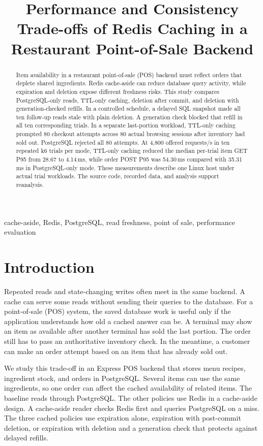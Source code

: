 \documentclass[conference]{IEEEtran}
\title{Performance and Consistency Trade-offs of Redis Caching in a Restaurant Point-of-Sale Backend}
\author{\IEEEauthorblockN{Prithvi Kurmi}
\IEEEauthorblockA{Department of Computer Science, Georgia State University\\
Atlanta, Georgia, USA\\
Preprint $\cdot$ DOI: 10.5281/zenodo.24367420}}
\begin{document}
\maketitle
\begin{abstract}
Item availability in a restaurant point-of-sale (POS) backend must reflect orders that deplete shared ingredients. Redis cache-aside can reduce database query activity, while expiration and deletion expose different freshness risks. This study compares PostgreSQL-only reads, TTL-only caching, deletion after commit, and deletion with generation-checked refills. In a controlled schedule, a delayed SQL snapshot made all ten follow-up reads stale with plain deletion. A generation check blocked that refill in all ten corresponding trials. In a separate last-portion workload, TTL-only caching prompted 80 checkout attempts across 80 actual browsing sessions after inventory had sold out. PostgreSQL rejected all 80 attempts. At 4{,}800 offered requests/s in ten repeated k6 trials per mode, TTL-only caching reduced the median per-trial item GET P95 from 28.67 to 4.14\,ms, while order POST P95 was 54.30\,ms compared with 35.31\,ms in PostgreSQL-only mode. These measurements describe one Linux host under actual trial workloads. The source code, recorded data, and analysis support reanalysis.
\end{abstract}

\begin{IEEEkeywords}
cache-aside, Redis, PostgreSQL, read freshness, point of sale, performance evaluation
\end{IEEEkeywords}

\section{Introduction}

Repeated reads and state-changing writes often meet in the same backend. A cache can serve some reads without sending their queries to the database. For a point-of-sale (POS) system, the saved database work is useful only if the application understands how old a cached answer can be. A terminal may show an item as available after another terminal has sold the last portion. The order still has to pass an authoritative inventory check. In the meantime, a customer can make an order attempt based on an item that has already sold out.

We study this trade-off in an Express POS backend that stores menu recipes, ingredient stock, and orders in PostgreSQL. Several items can use the same ingredients, so one order can affect the cached availability of related items. The baseline reads through PostgreSQL. The other policies use Redis in a cache-aside design. A cache-aside reader checks Redis first and queries PostgreSQL on a miss. The three cached policies use expiration alone, expiration with post-commit deletion, or expiration with deletion and a generation check that protects against delayed refills.
\end{document}
